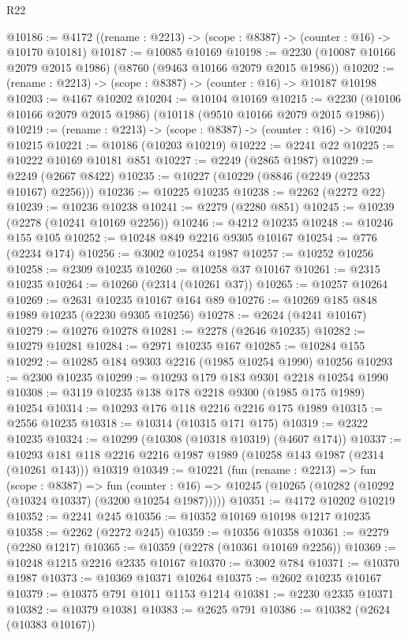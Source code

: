 \begin{lexlean}{R22}
\begin{coremodule}
@10186 := @4172 ((rename : @2213) -> (scope : @8387) -> (counter : @16) -> @10170 @10181)
@10187 := @10085 @10169
@10198 := @2230 (@10087 @10166 @2079 @2015 @1986) (@8760 (@9463 @10166 @2079 @2015 @1986))
@10202 := (rename : @2213) -> (scope : @8387) -> (counter : @16) -> @10187 @10198
@10203 := @4167 @10202
@10204 := @10104 @10169
@10215 := @2230 (@10106 @10166 @2079 @2015 @1986) (@10118 (@9510 @10166 @2079 @2015 @1986))
@10219 := (rename : @2213) -> (scope : @8387) -> (counter : @16) -> @10204 @10215
@10221 := @10186 (@10203 @10219)
@10222 := @2241 @22
@10225 := @10222 @10169 @10181 @851
@10227 := @2249 (@2865 @1987)
@10229 := @2249 (@2667 @8422)
@10235 := @10227 (@10229 (@8846 (@2249 (@2253 @10167) @2256)))
@10236 := @10225 @10235
@10238 := @2262 (@2272 @22)
@10239 := @10236 @10238
@10241 := @2279 (@2280 @851)
@10245 := @10239 (@2278 (@10241 @10169 @2256))
@10246 := @4212 @10235
@10248 := @10246 @155 @105
@10252 := @10248 @849 @2216 @9305 @10167
@10254 := @776 (@2234 @174)
@10256 := @3002 @10254 @1987
@10257 := @10252 @10256
@10258 := @2309 @10235
@10260 := @10258 @37 @10167
@10261 := @2315 @10235
@10264 := @10260 (@2314 (@10261 @37))
@10265 := @10257 @10264
@10269 := @2631 @10235 @10167 @164 @89
@10276 := @10269 @185 @848 @1989 @10235 (@2230 @9305 @10256)
@10278 := @2624 (@4241 @10167)
@10279 := @10276 @10278
@10281 := @2278 (@2646 @10235)
@10282 := @10279 @10281
@10284 := @2971 @10235 @167
@10285 := @10284 @155
@10292 := @10285 @184 @9303 @2216 (@1985 @10254 @1990) @10256
@10293 := @2300 @10235
@10299 := @10293 @179 @183 @9301 @2218 @10254 @1990
@10308 := @3119 @10235 @138 @178 @2218 @9300 (@1985 @175 @1989) @10254
@10314 := @10293 @176 @118 @2216 @2216 @175 @1989
@10315 := @2556 @10235
@10318 := @10314 (@10315 @171 @175)
@10319 := @2322 @10235
@10324 := @10299 (@10308 (@10318 @10319) (@4607 @174))
@10337 := @10293 @181 @118 @2216 @2216 @1987 @1989 (@10258 @143 @1987 (@2314 (@10261 @143))) @10319
@10349 := @10221
    (fun (rename : @2213) =>
    fun (scope : @8387) =>
    fun (counter : @16) => @10245 (@10265 (@10282 (@10292 (@10324 @10337) (@3200 @10254 @1987)))))
@10351 := @4172 @10202 @10219
@10352 := @2241 @245
@10356 := @10352 @10169 @10198 @1217 @10235
@10358 := @2262 (@2272 @245)
@10359 := @10356 @10358
@10361 := @2279 (@2280 @1217)
@10365 := @10359 (@2278 (@10361 @10169 @2256))
@10369 := @10248 @1215 @2216 @2335 @10167
@10370 := @3002 @784
@10371 := @10370 @1987
@10373 := @10369 @10371 @10264
@10375 := @2602 @10235 @10167
@10379 := @10375 @791 @1011 @1153 @1214
@10381 := @2230 @2335 @10371
@10382 := @10379 @10381
@10383 := @2625 @791
@10386 := @10382 (@2624 (@10383 @10167))

\end{coremodule}
\end{lexlean}
